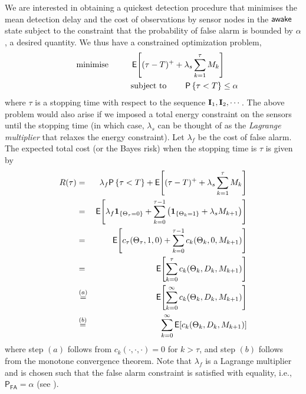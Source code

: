 \documentclass[journal]{IEEEtran}
\newcommand{\wake}{{${\sf awake }$}}
\newcommand{\pfa}{\mathsf{P_{FA}}}
\newcommand{\PROB}[1]{\mathsf{P}\left\{#1\right\}}
\newcommand{\EXP}[1]{\mathsf{E}\!\left[#1\right]}
\newcommand{\nn}{\nonumber \\}
\begin{document}
We are interested in obtaining a quickest detection procedure that
minimises the mean detection delay and the cost of observations by
sensor nodes in the {\wake} state subject to the constraint that the
probability of false alarm is bounded by $\alpha$, a desired quantity.
We thus have a constrained optimization problem,
\begin{eqnarray}
\label{eqn:constrained-opt-problem}
& & \text{minimise} \hspace{10mm} \EXP{(\tau-T)^+ + \lambda_s
\sum_{k=1}^\tau M_k} \ \ \ \ \ \\
& & \text{subject to} \hspace{8mm} \PROB{\tau < T} \le \alpha \nonumber
\end{eqnarray}
where $\tau$ is a stopping time with respect to the sequence ${\bf I}_1,
{\bf I}_2, \cdots$. The above problem would also arise if we imposed a
total energy constraint on the sensors until the stopping time (in which
case, $\lambda_s$ can be thought of as the {\em Lagrange multiplier} that
relaxes the energy constraint). 
Let $\lambda_f$ be the cost of false alarm. 
The expected total cost (or the Bayes risk) when the
stopping time is $\tau$ is given by 
\begin{eqnarray}
\label{eqn:unconstrained-problem}
R(\tau)  
& = & \lambda_f  \PROB{\tau<T} + \EXP{(\tau-T)^+  + \lambda_s  \sum_{k=1}^\tau M_k }\\
& = & \EXP{\lambda_f  {\bf 1}_{\left\{\Theta_\tau=0\right\}} + \sum_{k=0}^{\tau-1} \left( {\bf 1}_{\left\{\Theta_k=1\right\}} + \lambda_s  M_{k+1} \right)}\nonumber\\
& = & \EXP{c_\tau(\Theta_\tau, 1,0)  + \sum_{k=0}^{\tau-1} c_k(\Theta_k,0,M_{k+1}) }\nonumber\\
& = & \EXP{\sum_{k=0}^{\tau} c_k(\Theta_k,D_k,M_{k+1}) } \nonumber\\
& \stackrel{(a)}{=} & \EXP{\sum_{k=0}^{\infty} c_k(\Theta_k,D_k,M_{k+1})
}\nn
& \stackrel{(b)}{=} & \sum_{k=0}^{\infty} \EXP{c_k(\Theta_k,D_k,M_{k+1}) } 
\end{eqnarray}
where step $(a)$ follows from $c_k(\cdot,\cdot,\cdot)=0$ for $k >
\tau$, and step $(b)$ follows from the monotone convergence theorem. 
Note that $\lambda_f$ is a Lagrange multiplier and is chosen such that the false 
alarm constraint is satisfied with equality, i.e., $\pfa = \alpha$ 
(see \cite{shiryayev}). 
\end{document}
